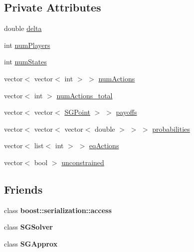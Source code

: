 \subsection*{Private Attributes}
\begin{DoxyCompactItemize}
\item 
double \hyperlink{classSGGame_a5031fc31f8009c19901c0930224e0465}{delta}
\item 
int \hyperlink{classSGGame_a6f02e3f92db6a3c5d2d9076dcb7b6d61}{num\-Players}
\item 
int \hyperlink{classSGGame_ae7b105b2fe9ee277d38e518223dd0482}{num\-States}
\item 
vector$<$ vector$<$ int $>$ $>$ \hyperlink{classSGGame_acebe94d195ffb67f92925bcd4c26d1a9}{num\-Actions}
\item 
vector$<$ int $>$ \hyperlink{classSGGame_a3b219a37177b5b8b38737f570e419429}{num\-Actions\-\_\-total}
\item 
vector$<$ vector$<$ \hyperlink{classSGPoint}{S\-G\-Point} $>$ $>$ \hyperlink{classSGGame_aad28dd39c6359e772286a938a948634c}{payoffs}
\item 
vector$<$ vector$<$ vector$<$ double $>$ $>$ $>$ \hyperlink{classSGGame_a167a281b11d524cb4a11dbaff3e9de68}{probabilities}
\item 
vector$<$ list$<$ int $>$ $>$ \hyperlink{classSGGame_a900ba2e4035c19b19dd5342219862347}{eq\-Actions}
\item 
vector$<$ bool $>$ \hyperlink{classSGGame_a528852e11bd68322535d7f24a41eca20}{unconstrained}
\end{DoxyCompactItemize}
\subsection*{Friends}
\begin{DoxyCompactItemize}
\item 
\hypertarget{classSGGame_ac98d07dd8f7b70e16ccb9a01abf56b9c}{class {\bfseries boost\-::serialization\-::access}}\label{classSGGame_ac98d07dd8f7b70e16ccb9a01abf56b9c}

\item 
\hypertarget{classSGGame_a8b0e5d2bebfed7e7e032366bb49bc5f1}{class {\bfseries S\-G\-Solver}}\label{classSGGame_a8b0e5d2bebfed7e7e032366bb49bc5f1}

\item 
\hypertarget{classSGGame_a80adcf9eac5da53e729646c94d3b8f1d}{class {\bfseries S\-G\-Approx}}\label{classSGGame_a80adcf9eac5da53e729646c94d3b8f1d}

\end{DoxyCompactItemize}


